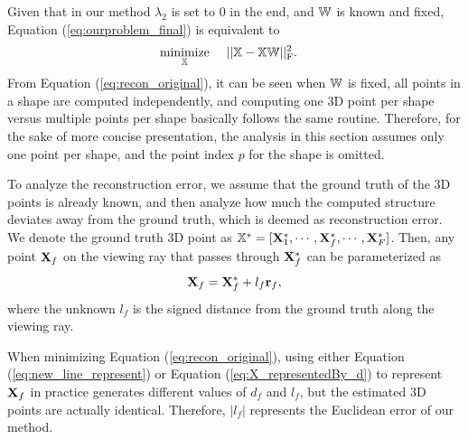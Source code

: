 Given that in our method $\lambda_2$ is set to 0 in the end, and $\mathbb W$ is known and fixed, Equation (\ref{eq:ourproblem_final}) is equivalent to
\begin{equation}
\begin{aligned}
& \underset{\mathbb X}{\text{minimize}}&& ~ || \mathbb X - \mathbb X\mathbb W||_\text{F}^2 . 
\end{aligned}
\label{eq:recon_original}
\end{equation}
From Equation (\ref{eq:recon_original}), it can be seen when $\mathbb W$ is fixed, all points in a shape are computed independently, and computing one 3D point per shape versus multiple points per shape basically follows the same routine. 
Therefore, for the sake of more concise presentation, the analysis in this section assumes only one point per shape, and the point index $p$ for the shape is omitted.

To analyze the reconstruction error, we assume that the ground truth of the 3D points is already known, and then analyze how much the computed structure deviates away from the ground truth, which is deemed as reconstruction error.
We denote the ground truth 3D point as
$\mathbb X^*=[\mathbf X_1^*, \cdots, \mathbf X_f^*,  \cdots, \mathbf X_F^*]$. 
Then, any point $\mathbf X_f$ on the viewing ray that passes through $\mathbf X^*_f$ can be parameterized as 
\begin{equation}
\mathbf X_f = \mathbf X^*_f + l_f \mathbf{r}_f,
\label{eq:new_line_represent}
\end{equation}
where the unknown $l_f$ is the signed distance from the ground truth along the viewing ray. 



When minimizing Equation (\ref{eq:recon_original}), using either Equation (\ref{eq:new_line_represent}) or Equation (\ref{eq:X_representedBy_d}) to represent $\mathbf X_f$ in practice generates different values of $d_f$ and $l_f$, but the estimated 3D points are actually identical. Therefore, $|l_f|$ represents the Euclidean error of our  method. 


